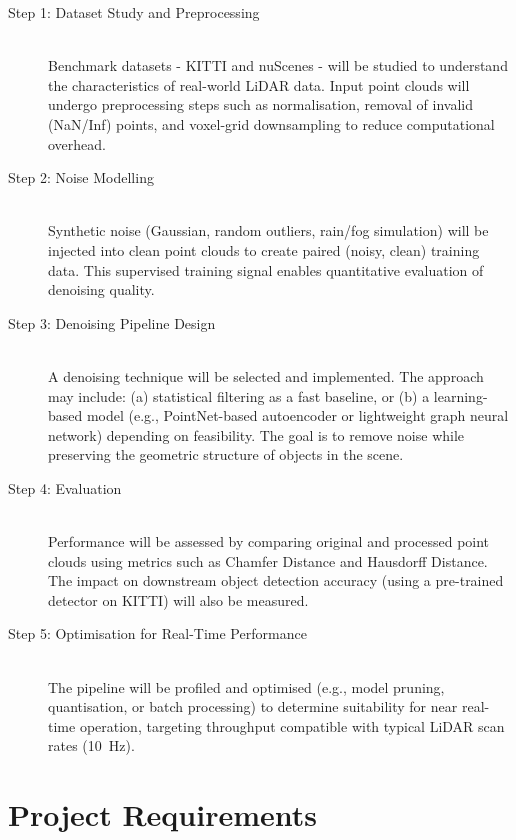 \documentclass[12pt,a4paper]{article}
\begin{document}
\begin{description}
\item[Step 1: Dataset Study and Preprocessing]\hfill\\
Benchmark datasets - KITTI \cite{geiger2012kitti} and nuScenes
\cite{caesar2020nuscenes} - will be studied to understand the characteristics
of real-world LiDAR data. Input point clouds will undergo preprocessing steps
such as normalisation, removal of invalid (NaN/Inf) points, and voxel-grid
downsampling to reduce computational overhead.

\item[Step 2: Noise Modelling]\hfill\\
Synthetic noise (Gaussian, random outliers, rain/fog simulation) will be
injected into clean point clouds to create paired (noisy, clean) training
data. This supervised training signal enables quantitative evaluation of
denoising quality.

\item[Step 3: Denoising Pipeline Design]\hfill\\
A denoising technique will be selected and implemented. The approach may
include: (a) statistical filtering as a fast baseline, or (b) a
learning-based model (e.g., PointNet-based autoencoder or lightweight graph
neural network) depending on feasibility. The goal is to remove noise while
preserving the geometric structure of objects in the scene.

\item[Step 4: Evaluation]\hfill\\
Performance will be assessed by comparing original and processed point clouds
using metrics such as Chamfer Distance and Hausdorff Distance. The impact on
downstream object detection accuracy (using a pre-trained detector on KITTI)
will also be measured.

\item[Step 5: Optimisation for Real-Time Performance]\hfill\\
The pipeline will be profiled and optimised (e.g., model pruning,
quantisation, or batch processing) to determine suitability for near
real-time operation, targeting throughput compatible with typical LiDAR scan
rates (10~Hz).
\end{description}
\clearpage

\section{Project Requirements}
\end{document}
